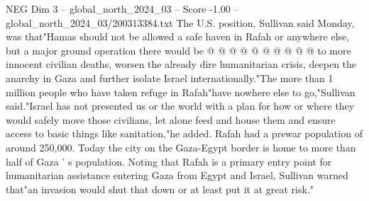 \begin{textsample}{NEG Dim 3 – global\_north\_2024\_03 – Score -1.00 – global\_north\_2024\_03/200313384.txt}
The U.S. position, Sullivan said Monday, was that"Hamas should not be allowed a safe haven in Rafah or anywhere else, but a major ground operation there would be @ @ @ @ @ @ @ @ @ @ to more innocent civilian deaths, worsen the already dire humanitarian crisis, deepen the anarchy in Gaza and further isolate Israel internationally."The more than 1 million people who have taken refuge in Rafah"have nowhere else to go,"Sullivan said."Israel has not presented us or the world with a plan for how or where they would safely move those civilians, let alone feed and house them and ensure access to basic things like sanitation,"he added.
Rafah had a prewar population of around 250,000.
Today the city on the Gaza-Egypt border is home to more than half of Gaza ' s population.
Noting that Rafah is a primary entry point for humanitarian assistance entering Gaza from Egypt and Israel, Sullivan warned that"an invasion would shut that down or at least put it at great risk."

\end{textsample}
